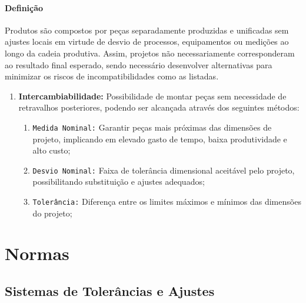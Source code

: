 \documentclass{article}
\begin{document}
            \paragraph{Definição}Produtos são compostos por peças separadamente produzidas e unificadas sem ajustes locais em virtude de desvio de processos, equipamentos ou medições ao longo da cadeia produtiva. Assim, projetos não necessariamente corresponderam ao resultado final esperado, sendo necessário desenvolver alternativas para minimizar os riscos de incompatibilidades como as listadas.
                \begin{enumerate}[noitemsep]
                    \item \textbf{Intercambiabilidade:} Possibilidade de montar peças sem necessidade de retravalhos posteriores, podendo ser alcançada através dos seguintes métodos:
                        \begin{enumerate}[noitemsep]
                            \item \texttt{Medida Nominal:} Garantir peças mais próximas das dimensões de projeto, implicando em elevado gasto de tempo, baixa produtividade e alto custo;
                            \item \texttt{Desvio Nominal:} Faixa de tolerância dimensional aceitável pelo projeto, possibilitando substituição e ajustes adequados;
                            \item \texttt{Tolerância:} Diferença entre os limites máximos e mínimos das dimensões do projeto;
                        \end{enumerate}
                \end{enumerate}
\newpage

    \section{Normas}
        \subsection{Sistemas de Tolerâncias e Ajustes}
\end{document}
